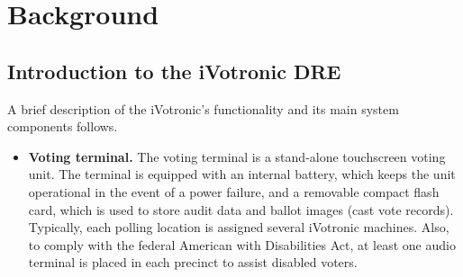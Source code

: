 \section{Background}
\label{sec:background}
\subsection{Introduction to the iVotronic DRE}
A brief description of the iVotronic's functionality and its main system components follows.

\begin{itemize} 
\item \textbf{Voting terminal.} The voting terminal is a stand-alone touchscreen voting unit.  The terminal is equipped with an internal battery, which keeps the unit operational in the event of a power failure, and a removable compact flash card, which is used to store audit data and ballot images (cast vote records). Typically, each polling location is assigned several iVotronic machines. Also, to comply with the federal American with Disabilities Act, at least one audio terminal is placed in each precinct to assist disabled voters.


\end{itemize}
